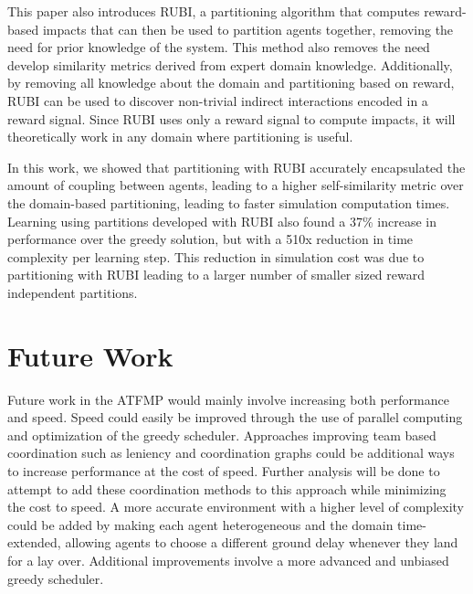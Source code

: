 \documentclass[onehalf,11pt]{beavtex}
\begin{document}

This paper also introduces RUBI, a partitioning algorithm that computes reward-based impacts that can then be used to partition agents together, removing the need for prior knowledge of the system. This method also removes the need develop similarity metrics derived from expert domain knowledge. Additionally, by removing all knowledge about the domain and partitioning based on reward, RUBI can be used to discover non-trivial indirect interactions encoded in a reward signal. Since RUBI uses only a reward signal to compute impacts, it will theoretically work in any domain where partitioning is useful.

In this work, we showed that partitioning with RUBI accurately encapsulated the amount of coupling between agents, leading to a higher self-similarity metric over the domain-based partitioning, leading to faster simulation computation times. Learning using partitions developed with RUBI also found a 37\% increase in performance over the greedy solution, but with a 510x reduction in time complexity per learning step. This reduction in simulation cost was due to partitioning with RUBI leading to a larger number of smaller sized reward independent partitions.

\section{Future Work}
Future work in the ATFMP would mainly involve increasing both performance and speed. Speed could easily be improved through the use of parallel computing and optimization of the greedy scheduler. Approaches improving team based coordination such as leniency \cite{Panait} and coordination graphs \cite{Kok:2006:CMR:1248547.1248612,Coordination} could be additional ways to increase performance at the cost of speed. Further analysis will be done to attempt to add these coordination methods to this approach while minimizing the cost to speed. A more accurate environment with a higher level of complexity could be added by making each agent heterogeneous and the domain time-extended, allowing agents to choose a different ground delay whenever they land for a lay over. Additional improvements involve a more advanced and unbiased greedy scheduler.
\end{document}
